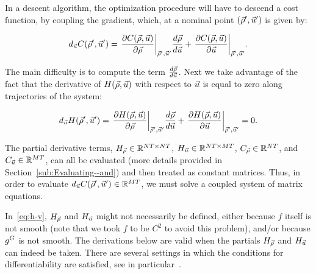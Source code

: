 In a descent algorithm, the optimization procedure will have to descend
a cost function, by coupling the gradient, which, at a nominal point
$\left(\nominal{\state},\nominal{\control}\right)$ is given by:

\begin{equation}
	d_{\control}\cost\left(\nominal{\state},\nominal{\control}\right)=\evaluate{\pfrac{\cost\text{\ensuremath{\left(\state,\control\right)}}}{\state}}{\nominal{\state},\nominal{\control}}\Dfrac{\state}{\control}+\evaluate{\pfrac{\cost\text{\ensuremath{\left(\state,\control\right)}}}{\control}}{\nominal{\state},\nominal{\control}}\label{eq:j-v}.
\end{equation}


The main difficulty is to compute the term $\frac{d\vec{\rho}}{d\vec{u}}$.
Next we take advantage of the fact that the derivative of $H\left(\state,\control\right)$
with respect to $\vec{u}$ is equal to zero along trajectories of
the system:

\begin{equation}
	d_{\control}\sys\left(\nominal{\state},\nominal{\control}\right)=\evaluate{\pfrac{\sys\text{\ensuremath{\left(\state,\control\right)}}}{\state}}{\nominal{\state},\nominal{\control}}\Dfrac{\state}{\control}+\evaluate{\pfrac{\sys\text{\ensuremath{\left(\state,\control\right)}}}{\control}}{\nominal{\state},\nominal{\control}}=0\label{eq:h-v}.
\end{equation}


The partial derivative terms, $H_{\vec{\rho}}\in\mathbb{R}^{NT\times NT}$,
$H_{\vec{u}}\in\mathbb{R}^{NT\times MT}$, $C_{\vec{\rho}}\in\mathbb{R}^{NT}$,
and $C_{\vec{u}}\in\mathbb{R}^{MT}$, can all be evaluated (more
details provided in Section~\ref{sub:Evaluating--and}) and then
treated as constant matrices. Thus, in order to evaluate $d_{\control}\cost\left(\nominal{\state},\nominal{\control}\right)\in\mathbb{R}^{\ncontrols\ntime}$,
we must solve a coupled system of matrix equations.
\begin{note}
	In~\eqref{eq:h-v}, $H_{\vec{\rho}}$ and $H_{\vec{u}}$ might not necessarily be defined,
	either because $f$ itself is not smooth (note that we took $f$ to
	be $C^{2}$ to avoid this problem), and/or because $g^{G}$ is not
	smooth. The derivations below are valid when the partials $H_{\vec{\rho}}$ and
	$H_{\vec{u}}$ can indeed be taken. There are several settings in which the
	conditions for differentiability are satisfied, see in particular~\cite{Gugat2005,Flasskamp2012}.
\end{note}

